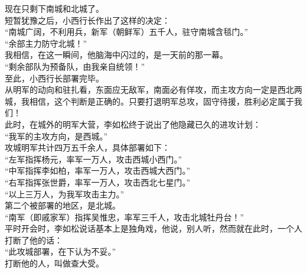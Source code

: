 \begin{multicols}{\theparacolNo}
现在只剩下南城和北城了。\\

短暂犹豫之后，小西行长作出了这样的决定：\\

“南城广阔，不利用兵，新军（朝鲜军）五千人，驻守南城含毯门。”\\

“余部主力防守北城！”\\

我相信，在这一瞬间，他脑海中闪过的，是一天前的那一幕。\\

“剩余部队为预备队，由我亲自统领！”\\

至此，小西行长部署完毕。\\

从明军的动向和驻扎看，东面应无敌军，南面必有佯攻，而主攻方向一定是西北两城，我相信，这个判断是正确的。只要打退明军总攻，固守待援，胜利必定属于我们！\\

此时，在城外的明军大营，李如松终于说出了他隐藏已久的进攻计划：\\

“我军的主攻方向，是西城。”\\

攻城明军共计四万五千余人，具体部署如下：\\

“左军指挥杨元，率军一万人，攻击西城小西门。”\\

“中军指挥李如柏，率军一万人，攻击西城大西门。”\\

“右军指挥张世爵，率军一万人，攻击西北七星门。”\\

“以上三万人，为我军攻击主力。”\\

第二个被部署的地区，是北城。\\

“南军（即戚家军）指挥吴惟忠，率军三千人，攻击北城牡丹台！”\\

平时开会时，李如松说话基本上是独角戏，他说，别人听，然而就在此时，一个人打断了他的话：\\

“此攻城部署，在下认为不妥。”\\

打断他的人，叫做查大受。\\


\end{multicols}
